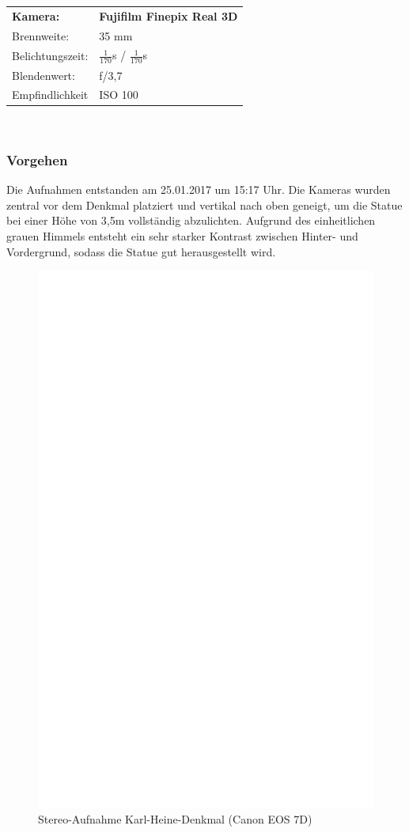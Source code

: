 \documentclass[liststotoc,bibtotoc,fontsize=14pt,]{scrreprt}
\begin{document}
		\begin{tabular}{ll}
			\textbf{Kamera:} &\textbf{Fujifilm Finepix Real 3D} \\
			Brennweite:& 35 mm \\
			Belichtungszeit: & $\frac{1}{170}$s / $\frac{1}{170}$s\\
			Blendenwert: & f/3,7\\
			Empfindlichkeit & ISO 100 \\
		\end{tabular}\\


\subsubsection{Vorgehen}
Die Aufnahmen entstanden am 25.01.2017 um 15:17 Uhr. Die Kameras wurden zentral vor dem Denkmal platziert und vertikal nach oben geneigt, um die Statue bei einer Höhe von 3,5m vollständig abzulichten. Aufgrund des einheitlichen grauen Himmels entsteht ein sehr starker Kontrast zwischen Hinter- und Vordergrund, sodass die Statue gut herausgestellt wird.

\newpage
\begin{figure}[h]
	\includegraphics[width=\linewidth]{img/ph.jpg}
	\caption{Stereo-Aufnahme Karl-Heine-Denkmal (Canon EOS 7D)}
\end{figure}
\end{document}
